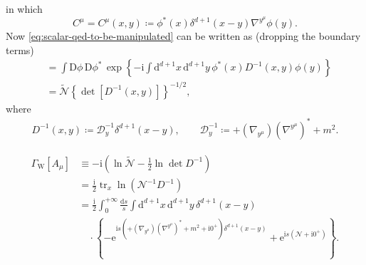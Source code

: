 \documentclass[12pt]{article}
\newcommand\mi{\mathrm{i}} %
\newcommand\me{\mathrm{e}} %
\newcommand\dif{\mathrm{d}}
\newcommand\Dif{\mathrm{D}}
\DeclareMathOperator{\tr}{tr}
\DeclareMathOperator{\Tr}{Tr}
\newcommand{\rbr}[1]{{\left(#1\right)}}
\newcommand{\cbr}[1]{{\left\{#1\right\}}}
\newcommand{\rfun}[2]{{#1}\mathopen{}\left(#2\right)\mathclose{}}
\newcommand{\sfun}[2]{{#1}\mathopen{}\left[#2\right]\mathclose{}}
\newcommand{\cfun}[2]{{#1}\mathopen{}\left\{#2\right\}\mathclose{}}
\begin{document}
in which
\begin{equation}
C^\mu = \rfun{C^\mu}{x,y} \coloneqq \rfun{\phi^*}{x} 
\rfun{\delta^{d+1}}{x-y} \nabla^{y^\mu}\rfun{\phi}{y}.
\end{equation}
Now \cref{eq:scalar-qed-to-be-manipulated} can be written as (dropping the 
boundary terms)
\begin{align}
&= \int\Dif\phi\,\Dif\phi^*\,
\cfun{\exp}{-\mi\int\dif^{d+1} x\,\dif^{d+1} y\,
\rfun{\phi^*}{x} \rfun{D^{-1}}{x, y} \rfun{\phi}{y}}
\nonumber \\
&= \tilde{\mathcal{N}}\cbr{\sfun{\det}{\rfun{D^{-1}}{x, y}}}^{-1/2},
\end{align}
where
\begin{align}
\rfun{D^{-1}}{x, y} \coloneqq \mathcal{D}^{-1}_y \rfun{\delta^{d+1}}{x-y},\qquad
\mathcal{D}^{-1}_y \coloneqq +\rbr{\nabla_{y^\mu}}\rbr{\nabla^{y^\mu}}^* + m^2.
\end{align}

\begin{align}
\sfun{\varGamma_\text{W}}{A_\mu} &\equiv
-\mi\rbr{\ln\tilde{\mathcal{N}} - \frac{1}{2} \ln \det D^{-1}} \nonumber \\
&= \frac{\mi}{2} \tr_x \rfun{\ln}{\mathcal{N}^{-1} D^{-1}} \nonumber \\
&= \frac{\mi}{2} \int_0^{+\infty}\frac{\dif s}{s}
\int\dif^{d+1}x\,\dif^{d+1}y\,\rfun{\delta^{d+1}}{x-y} \nonumber \\
&\quad\cdot\cbr{
-\me^{\mi s\rbr{+\rbr{\nabla_{y^\mu}}\rbr{\nabla^{y^\mu}}^* + m^2 + \mi 0^+}
\rfun{\delta^{d+1}}{x-y}}
+\me^{\mi s\rbr{\mathcal{N}+\mi 0^+}}}.
\end{align}




\cite{weisskopf1936}




\appendix

\end{document}
